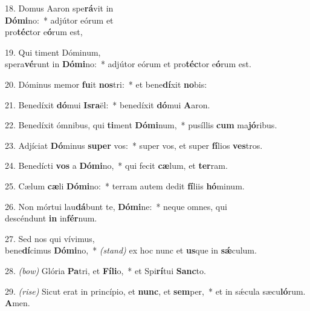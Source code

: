 18. Domus Aaron spe\textbf{rá}vit in\\ \textbf{Dó}\textbf{mi}no:~* 
	adjútor eórum et\\ pro\textbf{téc}tor e\textbf{ó}rum est,

19. Qui timent Dóminum,\\ spera\textbf{vé}runt in \textbf{Dó}\textbf{mi}no:~* 
	adjútor eórum et pro\textbf{téc}tor e\textbf{ó}rum est.

20. Dóminus memor \textbf{fu}it \textbf{nos}tri:~* 
	et bene\textbf{dí}xit \textbf{no}bis:

21. Benedíxit \textbf{dó}mui \textbf{Is}\textbf{ra}ël:~* 
	benedíxit \textbf{dó}mui \textbf{A}aron.

22. Benedíxit ómnibus, qui \textbf{ti}ment \textbf{Dó}\textbf{mi}num,~* 
	pusíllis \textbf{cum} ma\textbf{jó}ribus.

23. Adjíciat \textbf{Dó}minus \textbf{su}\textbf{per} vos:~* 
	super vos, et super \textbf{fí}lios \textbf{ves}tros.

24. Benedícti \textbf{vos} a \textbf{Dó}\textbf{mi}no,~* 
	qui fecit \textbf{cæ}lum, et \textbf{ter}ram.

25. Cælum \textbf{cæ}li \textbf{Dó}\textbf{mi}no:~* 
	terram autem dedit \textbf{fí}liis \textbf{hó}minum.

26. Non mórtui lau\textbf{dá}bunt te, \textbf{Dó}\textbf{mi}ne:~* 
	neque omnes, qui\\ descéndunt \textbf{in} in\textbf{fér}num.

27. Sed nos qui vívimus,\\ bene\textbf{dí}cimus \textbf{Dó}\textbf{mi}no,~* 
	{\color{red}\textit{(stand)}} ex hoc nunc et \textbf{us}que in \textbf{s\'{\ae}}culum.

28. {\color{red}\textit{(bow)}} Glória \textbf{Pa}tri, et \textbf{Fí}\textbf{li}o,~* 
	et Spi\textbf{rí}tui \textbf{Sanc}to.

29. {\color{red}\textit{(rise)}} Sicut erat in princípio, et \textbf{nunc}, et \textbf{sem}per,~* 
	et in s\'{\ae}cula sæcu\textbf{ló}rum. \textbf{A}men.
